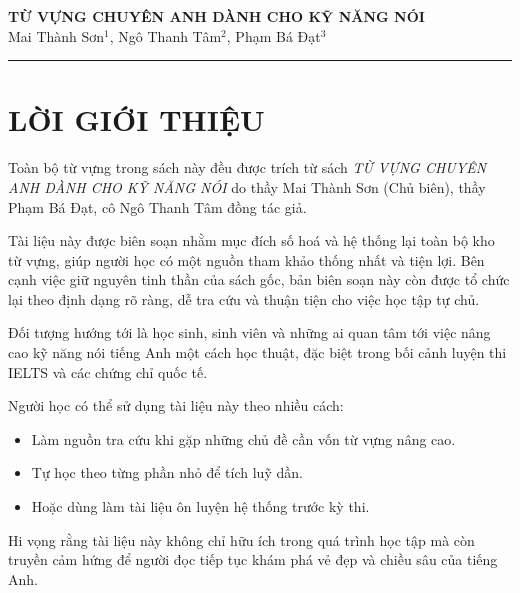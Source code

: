 \begin{center}
    
    \large \textbf{TỪ VỰNG CHUYÊN ANH DÀNH CHO KỸ NĂNG NÓI}\\
    \vspace{2mm}
    Mai Thành Sơn$^{1}$, Ngô Thanh Tâm$^{2}$, Phạm Bá Đạt$^{3}$\\

        \begin{center}
		    \textcolor{azul}{\rule{170mm}{0.5mm}}
	    \end{center}	
\end{center}

\section*{LỜI GIỚI THIỆU}
\thispagestyle{empty}
\noindent
Toàn bộ từ vựng trong sách này đều được trích từ sách \emph{TỪ VỰNG CHUYÊN ANH DÀNH CHO KỸ NĂNG NÓI} do thầy Mai Thành Sơn (Chủ biên), thầy Phạm Bá Đạt, cô Ngô Thanh Tâm đồng tác giả.

\vspace{3mm}
\noindent
Tài liệu này được biên soạn nhằm mục đích số hoá và hệ thống lại toàn bộ kho từ vựng,
giúp người học có một nguồn tham khảo thống nhất và tiện lợi. 
Bên cạnh việc giữ nguyên tinh thần của sách gốc, bản biên soạn này còn được 
tổ chức lại theo định dạng rõ ràng, dễ tra cứu và thuận tiện cho việc học tập tự chủ.


\vspace{3mm}
\noindent
Đối tượng hướng tới là học sinh, sinh viên và những ai quan tâm tới việc 
nâng cao kỹ năng nói tiếng Anh một cách học thuật, đặc biệt trong bối cảnh 
luyện thi IELTS và các chứng chỉ quốc tế. 


\vspace{3mm}
\noindent
Người học có thể sử dụng tài liệu này theo nhiều cách: 

\begin{itemize}
    \item Làm nguồn tra cứu khi gặp những chủ đề cần vốn từ vựng nâng cao.
    \item Tự học theo từng phần nhỏ để tích luỹ dần.
    \item Hoặc dùng làm tài liệu ôn luyện hệ thống trước kỳ thi.
\end{itemize}


 

\vspace{3mm}
\noindent
Hi vọng rằng tài liệu này không chỉ hữu ích trong quá trình 
học tập mà còn truyền cảm hứng để người đọc tiếp tục khám phá vẻ đẹp 
và chiều sâu của tiếng Anh.


\newpage

\clearpage
{
  \makeatletter
  \let\ps@plain\ps@empty
  \makeatother
  \pagestyle{empty}
  \tableofcontents
}
\clearpage